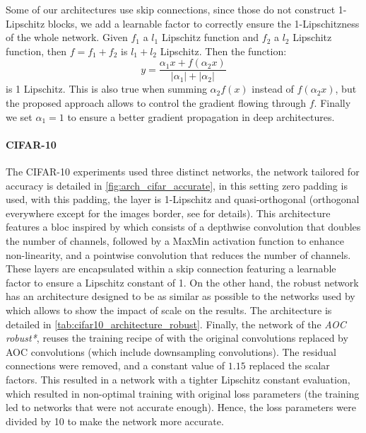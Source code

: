     Some of our architectures use skip connections, since those do not construct 1-Lipschitz blocks, we add a learnable factor to correctly ensure the 1-Lipschitzness of the whole network. Given $f_1$ a $l_1$ Lipschitz function and $f_2$ a $l_2$ Lipschitz function, then $f = f_1 + f_2$ is $l_1 + l_2$ Lipschitz. Then the function:
    \[
        y = \frac{\alpha_1 x + f(\alpha_2 x)}{|\alpha_1|+|\alpha_2|}
    \]
    is 1 Lipschitz. This is also true when summing $\alpha_2 f(x)$ instead of $f(\alpha_2 x)$, but the proposed approach allows to control the gradient flowing through $f$. Finally we set $\alpha_1 = 1$ to ensure a better gradient propagation in deep architectures.

\paragraph{CIFAR-10 \cite{krizhevsky2009learning}}
    
    The CIFAR-10 experiments used three distinct networks, the network tailored for accuracy is detailed in \cref{fig:arch_cifar_accurate}, in this setting zero padding is used, with this padding, the layer is 1-Lipschitz and quasi-orthogonal (orthogonal everywhere except for the images border, see \cite{delattre2023efficient, delattre2024spectral} for details). This architecture features a bloc inspired by \cite{trockman_patches_2022} which consists of a depthwise convolution that doubles the number of channels, followed by a MaxMin activation function \cite{anil_sorting_2019} to enhance non-linearity, and a pointwise convolution that reduces the number of channels. These layers are encapsulated within a skip connection featuring a learnable factor to ensure a Lipschitz constant of 1. On the other hand, the robust network has an architecture designed to be as similar as possible to the networks used by \cite{li_preventing_2019} which allows to show the impact of scale on the results. The architecture is detailed in \cref{tab:cifar10_architecture_robust}.
    Finally, the network of the \textit{AOC robust*}, reuses the training recipe of \cite{hu_recipe_2023} with the original convolutions replaced by AOC convolutions (which include downsampling convolutions). The residual connections were removed, and a constant value of $1.15$ replaced the scalar factors. This resulted in a network with a tighter Lipschitz constant evaluation, which resulted in non-optimal training with original loss parameters (the training led to networks that were not accurate enough). Hence, the loss parameters were divided by 10 to make the network more accurate.

